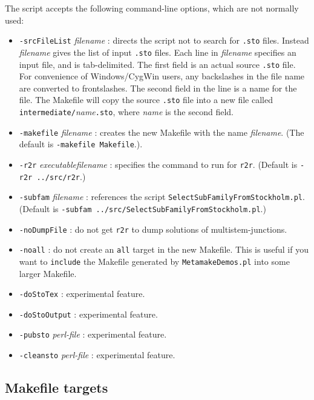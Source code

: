 \documentclass[letterpaper,12pt]{report}
\begin{document}
The script accepts the following command-line options, which are not normally used:
\begin{itemize}
\item {\tt -srcFileList} {\it filename} : directs the script not to search for {\tt .sto} files.  Instead {\it filename}
gives the list of input {\tt .sto} files.  Each line in {\it filename} specifies an input file, and is tab-delimited.
The first field is an actual source {\tt .sto} file.  For convenience of Windows/CygWin users, any backslashes in the file name
are converted to frontslashes.
The second field in the line is a name for the file.  The Makefile will copy the source {\tt .sto} file into a new
file called {\tt intermediate/}{\it name}{\tt .sto}, where {\it name} is the second field.
\item {\tt -makefile} {\it filename} : creates the new Makefile with the name {\it filename}.
(The default is {\tt -makefile Makefile}.).
\item {\tt -r2r} {\it executablefilename} : specifies the command to run for {\tt r2r}. (Default is {\tt -r2r ../src/r2r}.)
\item {\tt -subfam} {\it filename} : references the script {\tt SelectSubFamilyFromStockholm.pl}.  (Default is {\tt -subfam ../src/SelectSubFamilyFromStockholm.pl}.)
\item {\tt -noDumpFile} : do not get {\tt r2r} to dump solutions of multistem-junctions.
\item {\tt -noall} : do not create an {\tt all} target in the new Makefile.  This is useful if you want to {\tt include}
the Makefile generated by {\tt MetamakeDemos.pl} into some larger Makefile.
\item {\tt -doStoTex} : experimental feature.
\item {\tt -doStoOutput} : experimental feature.
\item {\tt -pubsto} {\it perl-file} : experimental feature.
\item {\tt -cleansto} {\it perl-file} : experimental feature.
\end{itemize}

\subsection{Makefile targets}
\end{document}
